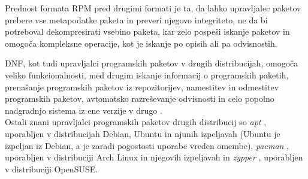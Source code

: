 Prednost formata RPM pred drugimi formati je ta, da lahko upravljalec paketov prebere vse metapodatke paketa in preveri
njegovo integriteto, ne da bi potreboval dekompresirati vsebino paketa, kar zelo pospeši iskanje paketov in omogoča
kompleksne operacije, kot je iskanje po opisih ali pa odvisnostih.

DNF, kot tudi upravljalci programskih paketov v drugih distribucijah,
omogoča veliko funkcionalnosti, med drugim iskanje informacij o programskih paketih, prenašanje programskih
paketov iz repozitorijev, namestitev in odmestitev programskih paketov, avtomatsko razreševanje odvisnosti in celo
popolno nadgradnjo sistema iz ene verzije v drugo \cite{fedora-dnf}.\\

Ostali znani upravljalci programskih paketov drugih distribucij so \emph{apt} \cite{ubuntu-pm},
uporabljen v distribucijah Debian, Ubuntu in njunih izpeljavah (Ubuntu je izpeljan iz Debian,
a je zaradi pogostosti uporabe vreden omembe), \emph{pacman} \cite{arch-pm}, uporabljen v distribuciji Arch Linux
in njegovih izpeljavah in \emph{zypper} \cite{opensuse-pm}, uporabljen v distribuciji OpenSUSE.